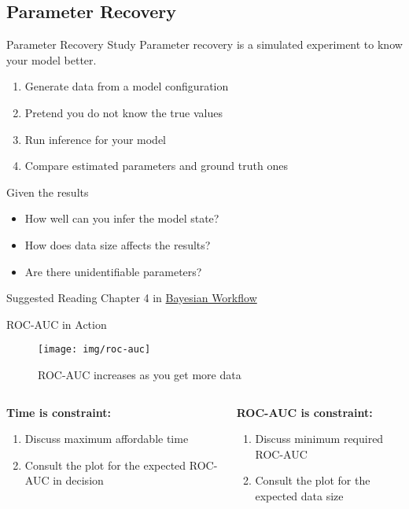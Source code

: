 \documentclass{beamer}
\begin{document}
\subsection{Parameter Recovery}
\begin{frame}{Parameter Recovery Study}
    Parameter recovery is a simulated experiment to know your model better. 
    \begin{enumerate}
        \item Generate data from a model configuration
        \item Pretend you do not know the true values
        \item Run inference for your model
        \item Compare estimated parameters and ground truth ones
    \end{enumerate}
    Given the results
    \begin{itemize}
        \item How well can you infer the model state?
        \item<alert@2> How does data size affects the results?
        \item Are there unidentifiable parameters? 
    \end{itemize}
    \begin{block}{Suggested Reading}
    Chapter 4 in \href{https://arxiv.org/abs/2011.01808}{Bayesian Workflow}
    \end{block}
\end{frame}

\begin{frame}{ROC-AUC in Action}
    \begin{figure}
        \centering
        \texttt{[image: img/roc-auc]}
        \caption{ROC-AUC increases as you get more data}
    \end{figure}
    \begin{columns}
    \begin{column}{0.5\linewidth}
    \textbf{Time is constraint:}
    \begin{enumerate}
        \item Discuss maximum affordable time
        \item Consult the plot for the expected ROC-AUC in decision
    \end{enumerate}
    \end{column}
    \begin{column}{0.5\linewidth}
    \textbf{ROC-AUC is constraint:}
    \begin{enumerate}
        \item Discuss minimum required ROC-AUC
        \item Consult the plot for the expected data size
    \end{enumerate}
    \end{column}
    \end{columns}
\end{frame}
\end{document}
